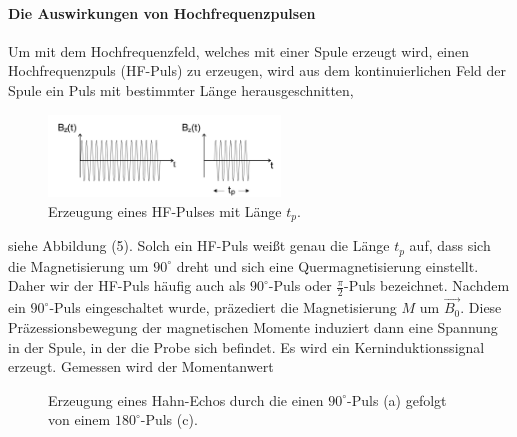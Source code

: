 \paragraph{Die Auswirkungen von Hochfrequenzpulsen}
Um mit dem Hochfrequenzfeld, welches mit einer Spule erzeugt wird, einen Hochfrequenzpuls (HF-Puls) zu erzeugen, wird aus dem kontinuierlichen Feld der Spule ein Puls mit bestimmter L\"{a}nge herausgeschnitten,
\setcounter{figure}{3}
\begin{figure}[hbtp]
	\centering
	\vspace{-10pt}
	\caption{Erzeugung eines HF-Pulses mit L\"{a}nge $t_p$.}
	\includegraphics[width=0.55\textwidth]{Plots/HFPuls.png}
\end{figure}
siehe Abbildung (5).
Solch ein HF-Puls wei{\ss}t genau die L\"{a}nge $t_p$ auf, dass sich die Magnetisierung um $90^{\circ}$ dreht und sich eine Quermagnetisierung einstellt.
Daher wir der HF-Puls h\"{a}ufig auch als $90^{\circ}$-Puls oder $\frac{\pi}{2}$-Puls bezeichnet.
Nachdem ein $90^{\circ}$-Puls eingeschaltet wurde, pr\"{a}zediert die Magnetisierung $M$ um $\overrightarrow{B_0}$.
Diese Pr\"{a}zessionsbewegung der magnetischen Momente induziert dann eine Spannung in der Spule, in der die Probe sich befindet.
Es wird ein Kerninduktionssignal erzeugt.
Gemessen wird der Momentanwert
\begin{figure}
	\vspace{-5pt}
	\centering
	\caption{Erzeugung eines Hahn-Echos durch die einen $90^{\circ}$-Puls (a) gefolgt von einem $180^{\circ}$-Puls (c).}
	\label{HahnEcho}
\end{figure}
